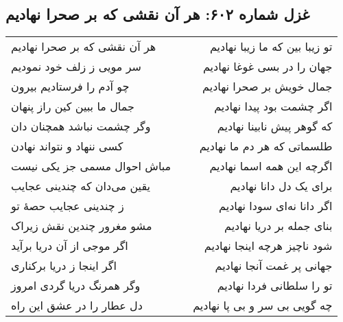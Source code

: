 \begin{center}
\section*{غزل شماره ۶۰۲: هر آن نقشی که بر صحرا نهادیم}
\label{sec:602}
\begin{longtable}{l p{0.5cm} r}
هر آن نقشی که بر صحرا نهادیم
&&
تو زیبا بین که ما زیبا نهادیم
\\
سر مویی ز زلف خود نمودیم
&&
جهان را در بسی غوغا نهادیم
\\
چو آدم را فرستادیم بیرون
&&
جمال خویش بر صحرا نهادیم
\\
جمال ما ببین کین راز پنهان
&&
اگر چشمت بود پیدا نهادیم
\\
وگر چشمت نباشد همچنان دان
&&
که گوهر پیش نابینا نهادیم
\\
کسی ننهاد و نتواند نهادن
&&
طلسماتی که هر دم ما نهادیم
\\
مباش احوال مسمی جز یکی نیست
&&
اگرچه این همه اسما نهادیم
\\
یقین می‌دان که چندینی عجایب
&&
برای یک دل دانا نهادیم
\\
ز چندینی عجایب حصهٔ تو
&&
اگر دانا نه‌ای سودا نهادیم
\\
مشو مغرور چندین نقش زیراک
&&
بنای جمله بر دریا نهادیم
\\
اگر موجی از آن دریا برآید
&&
شود ناچیز هرچه اینجا نهادیم
\\
اگر اینجا ز دریا برکناری
&&
جهانی پر غمت آنجا نهادیم
\\
وگر همرنگ دریا گردی امروز
&&
تو را سلطانی فردا نهادیم
\\
دل عطار را در عشق این راه
&&
چه گویی بی سر و بی پا نهادیم
\\
\end{longtable}
\end{center}
